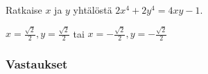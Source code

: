 \begin{tehtava} %
    Ratkaise $x$ ja $y$ yhtälöstä $2x^4+2y^4=4xy-1$. %
    \begin{vastaus}
        $x=\frac{\sqrt{2}}{2}, y=\frac{\sqrt{2}}{2}$ tai $x=-\frac{\sqrt{2}}{2}, y=-\frac{\sqrt{2}}{2}$
    \end{vastaus}
\end{tehtava}


\subsubsection*{Vastaukset}

